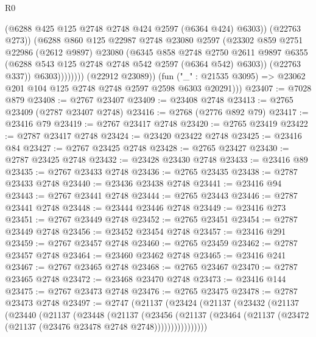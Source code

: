 \begin{lexlean}{R0}
\begin{coremodule}
                            (@6288 @425 @125 @2748 @2748 @424 @2597 (@6364 @424) @6303))
                          (@22763 @273))
                        (@6288
                          @860
                          @125
                          @22987
                          @2748
                          @23080
                          @2597
                          (@23302
                            @859
                            @2751
                            @22986
                            (@2612 @9897)
                            @23080
                            (@6345
                              @858
                              @2748
                              @2750
                              @2611
                              @9897
                              @6355
                              (@6288 @543 @125 @2748 @2748 @542 @2597 (@6364 @542) @6303))
                            (@22763 @337))
                          @6303))))))))
          (@22912 @23089))
        (fun ("_" : @21535 @3095) => @23062 @201 @104 @125 @2748 @2748 @2597 @2598 @6303 @20291)))
@23407 := @7028 @879
@23408 := @2767 @23407
@23409 := @23408 @2748
@23413 := @2765 @23409 (@2787 @23407 @2748)
@23416 := @2768 (@2776 @892 @79)
@23417 := @23416 @79
@23419 := @2767 @23417 @2748
@23420 := @2765 @23419
@23422 := @2787 @23417 @2748
@23424 := @23420 @23422 @2748
@23425 := @23416 @84
@23427 := @2767 @23425 @2748
@23428 := @2765 @23427
@23430 := @2787 @23425 @2748
@23432 := @23428 @23430 @2748
@23433 := @23416 @89
@23435 := @2767 @23433 @2748
@23436 := @2765 @23435
@23438 := @2787 @23433 @2748
@23440 := @23436 @23438 @2748
@23441 := @23416 @94
@23443 := @2767 @23441 @2748
@23444 := @2765 @23443
@23446 := @2787 @23441 @2748
@23448 := @23444 @23446 @2748
@23449 := @23416 @273
@23451 := @2767 @23449 @2748
@23452 := @2765 @23451
@23454 := @2787 @23449 @2748
@23456 := @23452 @23454 @2748
@23457 := @23416 @291
@23459 := @2767 @23457 @2748
@23460 := @2765 @23459
@23462 := @2787 @23457 @2748
@23464 := @23460 @23462 @2748
@23465 := @23416 @241
@23467 := @2767 @23465 @2748
@23468 := @2765 @23467
@23470 := @2787 @23465 @2748
@23472 := @23468 @23470 @2748
@23473 := @23416 @144
@23475 := @2767 @23473 @2748
@23476 := @2765 @23475
@23478 := @2787 @23473 @2748
@23497 := @2747
    (@21137
      (@23424
        (@21137
          (@23432
            (@21137
              (@23440
                (@21137
                  (@23448
                    (@21137
                      (@23456
                        (@21137
                          (@23464 (@21137 (@23472 (@21137 (@23476 @23478 @2748 @2748))))))))))))))))

\end{coremodule}
\end{lexlean}
